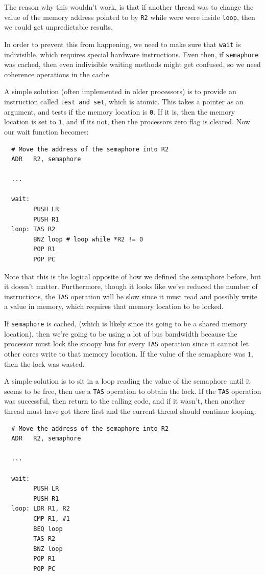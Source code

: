The reason why this wouldn't work, is that if another thread was to
change the value of the memory address pointed to by \texttt{R2} while
were were inside
\texttt{loop}, then we could get unpredictable results.

In order to prevent this from happening, we need to make sure
that \texttt{wait} is indivisible, which requires special hardware
instructions. Even then, if
\texttt{semaphore} was cached, then even indivisible waiting methods might get
confused, so we need coherence operations in the cache.

A simple solution (often implemented in older processors) is to
provide an instruction called \texttt{test and set}, which is
atomic. This takes a pointer as an argument, and tests if the memory
location is \texttt{0}. If it is, then the memory location is set
to \texttt{1}, and if its not, then the processors zero flag is
cleared. Now our wait function becomes:

\begin{verbatim}
  # Move the address of the semaphore into R2
  ADR   R2, semaphore

  ...

  wait:
        PUSH LR
        PUSH R1
  loop: TAS R2
        BNZ loop # loop while *R2 != 0
        POP R1
        POP PC
\end{verbatim}

Note that this is the logical opposite of how we defined the semaphore
before, but it doesn't matter. Furthermore, though it looks like we've
reduced the number of instructions, the \texttt{TAS} operation will be
slow since it must read and possibly write a value in memory, which
requires that memory location to be locked.

If \texttt{semaphore} is cached, (which is likely since its going to
be a shared memory location), then we're going to be using a lot of
bus bandwidth because the processor must lock the snoopy bus for
every \texttt{TAS} operation since it cannot let other cores write to
that memory location. If the value of the semaphore was $1$, then the
lock was wasted.

A simple solution is to sit in a loop reading the value of the
semaphore until it seems to be free, then use a \texttt{TAS} operation
to obtain the lock. If the \texttt{TAS} operation was successful, then
return to the calling code, and if it wasn't, then another thread must
have got there first and the current thread should continue looping:

\begin{verbatim}
  # Move the address of the semaphore into R2
  ADR   R2, semaphore

  ...

  wait:
        PUSH LR
        PUSH R1
  loop: LDR R1, R2
        CMP R1, #1
        BEQ loop
        TAS R2
        BNZ loop
        POP R1
        POP PC
\end{verbatim}

